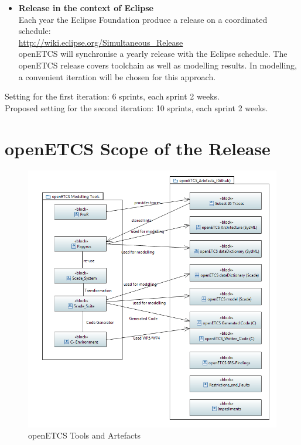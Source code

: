 \documentclass{template/openetcs_report}
\begin{document}
\begin{description}
\begin{itemize}
\item \textbf{Release in the context of Eclipse}\\
Each year the Eclipse Foundation produce a release on a coordinated schedule:\\
\url{http://wiki.eclipse.org/Simultaneous_Release}\\
openETCS will synchronise a yearly release with the Eclipse schedule. The openETCS release covers toolchain as well as modelling results. In modelling, a convenient iteration will be chosen for this approach.\\
   
\end{itemize}

Setting for the first iteration: 6 sprints, each sprint 2 weeks.\\
Proposed setting for the second iteration: 10 sprints, each sprint 2 weeks.\\


\section{openETCS Scope of the Release}

\begin{figure}
\includegraphics[width=\textwidth]{figures/ReleasePlan.png}
\caption{openETCS Tools and Artefacts
\label{f:tools}}
\end{figure}


\end{description}
\end{document}

